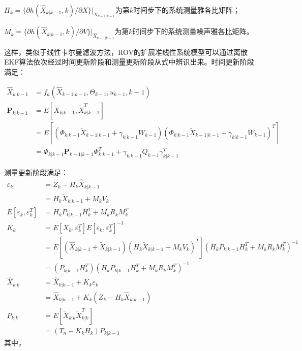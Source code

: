 $H_k=\{\partial h(\hat{X}_{k|k-1},k)/\partial X\}|_{\hat{X}_{k-1|k-1}}$为第$k$时间步下的系统测量雅各比矩阵；

$M_k=\{\partial h(\hat{X}_{k|k-1},k)/\partial V\}|_{\hat{X}_{k-1|k-1}}$为第$k$时间步下的系统测量噪声雅各比矩阵。

这样，类似于线性卡尔曼滤波方法，ROV的扩展准线性系统模型可以通过离散EKF算法依次经过时间更新阶段和测量更新阶段从式中辨识出来。时间更新阶段满足：

\begin{equation}
    \begin{aligned}
            \hat{X}_{k|k-1} & =f_a\left(\hat{X}_{k-1|k-1}, \Theta_{k-1}, u_{k-1}, k-1\right) \\
            \mathbf{P}_{k|k-1} & = E\left[\tilde{X}_{k|k-1},\tilde{X}^T_{k|k-1} \right] \\ 
              & =E\left[(\Phi_{k|k-1}\tilde{X}_{k-1|k-1} + \gamma_{k|k-1}W_{k-1})(\Phi_{k|k-1}\tilde{X}_{k-1|k-1} + \gamma_{k|k-1}W_{k-1})^T\right] \\
              & =\Phi_{k|k-1}\mathbf{P}_{k-1|k-1}\Phi_{k|k-1}^T + \gamma_{k|k-1}Q_{k-1}\gamma_{k|k-1}^T
    \end{aligned}
\end{equation}

测量更新阶段满足：
\begin{equation}
\begin{aligned}
        \varepsilon_{k} & =Z_k - H_k\hat{X}_{k|k-1} \\
                        & = H_k\tilde{X}_{k|k-1} + M_kV_k \\
        E\left[\varepsilon_k, \varepsilon_k^T\right] & = H_kP_{k|k-1}H_k^T + M_kR_kM_k^T \\
        K_k  & = E\left[X_k, \varepsilon_k^T\right]E\left[\varepsilon_k, \varepsilon_k^T\right]^{-1} \\
        & =E\left[\left(\hat{X}_{k|k-1}+\tilde{X}_{k|k-1}\right)\left(H_k\tilde{X}_{k|k-1} + M_kV_k\right)^T\right](H_kP_{k|k-1}H_k^T + M_kR_kM_k^T)^{-1}\\
        & =(P_{k|k-1}H_k^T)(H_kP_{k|k-1}H_k^T + M_kR_kM_k^T)^{-1} \\
        \hat{X}_{k|k} & =\hat{X}_{k|k-1}+K_k\varepsilon_k \\
        & = \hat{X}_{k|k-1} + K_k(Z_k-H_k\hat{X}_{k|k-1}) \\
        P_{k|k} & =E\left[\tilde{X}_{k|k}\tilde{X}_{k|k}^T\right] \\
        & = (T_n - K_kH_k)P_{k|k-1} 
\end{aligned}
\end{equation}
其中，

